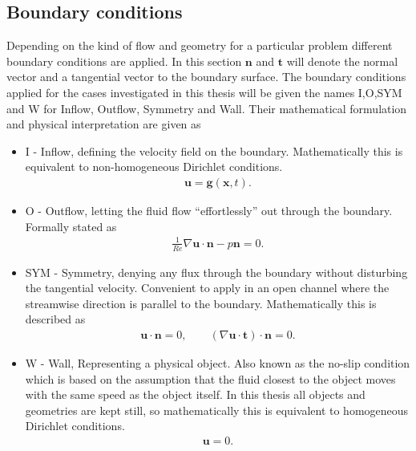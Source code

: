 \subsection{Boundary conditions}
Depending on the kind of flow and geometry for a particular problem different boundary conditions are applied. In this section 
$\mathbf{n}$ and $\mathbf{t}$ will denote the normal vector and a tangential vector to the boundary surface.
The boundary conditions applied for the cases investigated in this thesis will be given the names 
I,O,SYM and W for Inflow, Outflow, Symmetry and Wall. Their mathematical formulation and physical interpretation are given as 
\begin{itemize}
    \item I 
        - Inflow, defining the velocity field on the boundary. Mathematically this is equivalent to 
        non-homogeneous Dirichlet conditions. 
        \begin{align}
            \mathbf{u} = \mathbf{g}(\mathbf{x},t).
        \end{align}
    \item O 
        - Outflow, letting the fluid flow ``effortlessly'' out through the boundary. Formally stated as
        \begin{align}
            \frac{1}{Re} \nabla\mathbf{u}\cdot \mathbf{n}-p\mathbf{n}= 0.
        \end{align}
    \item SYM 
        - Symmetry, denying any flux through the boundary without disturbing the tangential velocity. Convenient
        to apply in an open channel where the streamwise direction is parallel to the boundary. Mathematically this is 
        described as 
        \begin{align}
            \mathbf{u}\cdot \mathbf{n} = 0, \qquad (\nabla\mathbf{u}\cdot \mathbf{t})\cdot \mathbf{n} = 0.
        \end{align}
    \item W 
        - Wall, Representing a physical object. Also known as the no-slip condition which is based on the assumption 
        that the fluid closest to the object moves with the same speed as the object itself. In this thesis all objects and 
        geometries are kept still, so mathematically this is equivalent to 
        homogeneous Dirichlet conditions. 
        \begin{align}
            \mathbf{u} = 0.
        \end{align}

\end{itemize}
%
